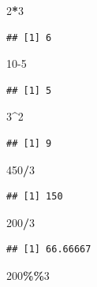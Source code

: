 \documentclass[
]{book}
\newenvironment{Shaded}{\begin{snugshade}}{\end{snugshade}}
\newcommand{\DecValTok}[1]{\textcolor[rgb]{0.00,0.00,0.81}{#1}}
\newcommand{\OperatorTok}[1]{\textcolor[rgb]{0.81,0.36,0.00}{\textbf{#1}}}
\begin{document}
\begin{Shaded}
\begin{Highlighting}[]
\DecValTok{2}\OperatorTok{*}\DecValTok{3}
\end{Highlighting}
\end{Shaded}

\begin{verbatim}
## [1] 6
\end{verbatim}

\begin{Shaded}
\begin{Highlighting}[]
\DecValTok{10{-}5}
\end{Highlighting}
\end{Shaded}

\begin{verbatim}
## [1] 5
\end{verbatim}

\begin{Shaded}
\begin{Highlighting}[]
\DecValTok{3}\OperatorTok{\^{}}\DecValTok{2}
\end{Highlighting}
\end{Shaded}

\begin{verbatim}
## [1] 9
\end{verbatim}

\begin{Shaded}
\begin{Highlighting}[]
\DecValTok{450}\OperatorTok{/}\DecValTok{3}
\end{Highlighting}
\end{Shaded}

\begin{verbatim}
## [1] 150
\end{verbatim}

\begin{Shaded}
\begin{Highlighting}[]
\DecValTok{200}\OperatorTok{/}\DecValTok{3}
\end{Highlighting}
\end{Shaded}

\begin{verbatim}
## [1] 66.66667
\end{verbatim}

\begin{Shaded}
\begin{Highlighting}[]
\DecValTok{200}\OperatorTok{\%\%}\DecValTok{3}
\end{Highlighting}
\end{Shaded}
\end{document}
